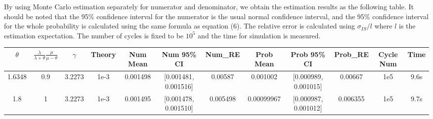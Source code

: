 \documentclass{article}
\begin{document}
By using Monte Carlo estimation separately for numerator and denominator, we obtain the estimation results as the following table. It should be noted that the 95\% confidence interval for the numerator is the usual normal confidence interval, and the 95\% confidence interval for the whole probability is calculated using the same formula as equation (6). 
The relative error is calculated using $\sigma_{IS}/l$ where $l$ is the estimation expectation. The number of cycles is fixed to be $10^5$ and the time for simulation is measured. 
\begin{table}[!htbp]
    \tiny
	\centering
	\begin{tabularx}{1.07\textwidth}{cccccccccccc}
		\toprule
        $\theta$
		& $\frac{\lambda}{\lambda + \theta} \frac{\mu}{\mu - \theta}$
		& $\gamma$
		& Theory
		& Num Mean
		& Num 95\% CI
		& Num\_RE
		& Prob Mean
		& Prob 95\% CI
		& Prob\_RE
		& Cycle Num
        & Time\\

        \midrule
        1.6348
        & 0.9
        & 3.2273
		& 1e-3
		& 0.001498
		& [0.001481, 0.001516]
		& 0.00587
		& 0.001002
		& [0.000989, 0.001015]
		& 0.00667
		& 1e5
		& 9.6s

        \\
        \midrule
        1.8
        & 1
        & 3.2273
		& 1e-3
		& 0.001495
		& [0.001478, 0.001510]
		& 0.005498
		& 0.00099967
		& [0.000987, 0.001012]
		& 0.006355
		& 1e5
		& 9.7s
        \\
		

\end{tabularx}
\end{table}
\end{document}
